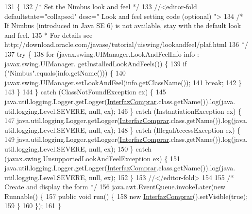 \begin{DoxyCode}
131                                            \{
132         \textcolor{comment}{/* Set the Nimbus look and feel */}
133         \textcolor{comment}{//<editor-fold defaultstate="collapsed" desc=" Look and feel setting code (optional) ">}
134         \textcolor{comment}{/* If Nimbus (introduced in Java SE 6) is not available, stay with the default look and feel.}
135 \textcolor{comment}{         * For details see http://download.oracle.com/javase/tutorial/uiswing/lookandfeel/plaf.html }
136 \textcolor{comment}{         */}
137         \textcolor{keywordflow}{try} \{
138             \textcolor{keywordflow}{for} (javax.swing.UIManager.LookAndFeelInfo info : javax.swing.UIManager.
      getInstalledLookAndFeels()) \{
139                 \textcolor{keywordflow}{if} (\textcolor{stringliteral}{"Nimbus"}.equals(info.getName())) \{
140                     javax.swing.UIManager.setLookAndFeel(info.getClassName());
141                     \textcolor{keywordflow}{break};
142                 \}
143             \}
144         \} \textcolor{keywordflow}{catch} (ClassNotFoundException ex) \{
145             java.util.logging.Logger.getLogger(\mbox{\hyperlink{class_interfaz_package_1_1_interfaz_comprar_a6804902a37338613a4d0ff3fcbec5f42}{InterfazComprar}}.class.getName()).log(java.
      util.logging.Level.SEVERE, null, ex);
146         \} \textcolor{keywordflow}{catch} (InstantiationException ex) \{
147             java.util.logging.Logger.getLogger(\mbox{\hyperlink{class_interfaz_package_1_1_interfaz_comprar_a6804902a37338613a4d0ff3fcbec5f42}{InterfazComprar}}.class.getName()).log(java.
      util.logging.Level.SEVERE, null, ex);
148         \} \textcolor{keywordflow}{catch} (IllegalAccessException ex) \{
149             java.util.logging.Logger.getLogger(\mbox{\hyperlink{class_interfaz_package_1_1_interfaz_comprar_a6804902a37338613a4d0ff3fcbec5f42}{InterfazComprar}}.class.getName()).log(java.
      util.logging.Level.SEVERE, null, ex);
150         \} \textcolor{keywordflow}{catch} (javax.swing.UnsupportedLookAndFeelException ex) \{
151             java.util.logging.Logger.getLogger(\mbox{\hyperlink{class_interfaz_package_1_1_interfaz_comprar_a6804902a37338613a4d0ff3fcbec5f42}{InterfazComprar}}.class.getName()).log(java.
      util.logging.Level.SEVERE, null, ex);
152         \}
153         \textcolor{comment}{//</editor-fold>}
154 
155         \textcolor{comment}{/* Create and display the form */}
156         java.awt.EventQueue.invokeLater(\textcolor{keyword}{new} Runnable() \{
157             \textcolor{keyword}{public} \textcolor{keywordtype}{void} run() \{
158                 \textcolor{keyword}{new} \mbox{\hyperlink{class_interfaz_package_1_1_interfaz_comprar_a6804902a37338613a4d0ff3fcbec5f42}{InterfazComprar}}().setVisible(\textcolor{keyword}{true});
159             \}
160         \});
161     \}
\end{DoxyCode}


